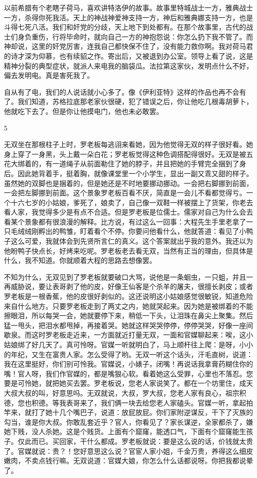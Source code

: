 以前希腊有个老瞎子荷马，喜欢讲特洛伊的故事。故事里特城战士一方，雅典战士一方，杀得你死我活。天上的神战神爱神支持一方，神后和雅典娜支持一方，也是斗得七死八活。我们和奸党的分歧，天上地下到处都有。在那个故事里，古代的战士们身负重伤，行将毕命时，就向自己一方的神抱怨说：你怎么扔下我不管了。而神却说，这里的奸党厉害，连我自己都快保不住了，没有能力救你啊。我对荷马君的诗才深为仰慕，也有续貂之作。寄出后，又被退到办公室。领导上看了说，这是精神分裂的典型症状，就派人来电我的脑袋瓜。法拉第这家伙，发明点什么不好，偏去发明电。真是害死我了。 

自从有了电，我们的人说话就小心多了。像《伊利亚特》这样的作品也再不会有了。我们知道，苏格拉底那老家伙很硬，犯了错误之后，你让他吃几根毒胡萝卜，他就吃下去了。但是你让他摸电门，他也未必敢罢。 

5 

无双坐在那根柱子上时，罗老板每逃诩来看她，因为他觉得无双的样子很好看。她身上穿了一身黑，头上戴一朵白花；罗老板觉得这种色调搭配得很好。无双是被五花大绑着的，有一道绳子从前面勒住了她的脖子，并且把她的手臂完全捆到了身后。因此她背着手，挺着胸，就像课堂里一个小学生，显出一副又乖又甜的样子。虽然她的双脚也是捆着的，但是她还是不时地要挪动挪动。一会把右脚挪到前面，一会把左脚挪到前面。这个景象罗老板百看不厌，简直是一会儿不看都觉得亏。一个十六七岁的小姑娘，爹死了，娘卖了，自己像一双鞋一样被摆上了货架，你老去看人家，我觉得多少是有点不合适。但是罗老板是位儒士。儒家对自己为什么会去看某个景象都有很浪漫的解释。比方说，有过这么一回事：大程先生手里老拿了一只毛绒绒刚孵出的鸭雏，盯着看个不停。你要问他看什么，他就答道：看见了小鸭子这么可爱，我就体会到先贤所言仁的真义。这个答案就出乎我的意外。我还以为他盼鸭子快点长，好烤来吃呢。罗老板老去看无双，当然有正当的理由，但具体是什么，我不知道。你就顺着大程的思路去想像罢。 

不知为什么，无双见到了罗老板就要破口大骂，说他是一条蛔虫，一只蛆，并且一再威胁说，要让表哥剥了他的皮，好像王仙客是个杀羊的屠夫，很擅长剥皮；或者罗老板是一根香蕉，他的皮很好剥似的。这还说明这小姑娘感觉很敏锐，知道危险来自什么地方。只要罗老板走到了两丈之内，她就哭起来。因为她是被绑着的不能擦眼泪，所以每哭一会，她就要停下来，稍低一下头，让泪珠在鼻尖上聚集。然后猛一甩头，把泪水都甩掉，再接着哭。她就这样哭哭停停，停停哭哭，好像一座间歇泉。而这时罗老板走近来，一方面就近打量无双，一面和官媒聊起来：唉，这小姑娘绑了好几天了。真可怜呀。官媒一听就明白了，马上顺杆往上爬：是呀，小小的年纪，又生在富贵人家。怎么受得了哟。无双一听这个话头，汗毛直树，说道：我在这里挺好，你们别可怜我。官媒说，小婊子，闭嘴！再说话我拿膏药糊住你的嘴！官人呀，我们作官媒的，都是嘴狠心软。看着她这么受罪，心里也不落忍。您要是可怜她，就把她买去罢。罗老板说，您老人家说笑了。都在一个坊里住，成天大叔大叔的叫，好意思吗。无双就说，大叔，罗大叔，您老人家有良心，祖宗积德，您也积德。等我表哥来了，我们俩一块去给您老人家磕头。官媒一听，拿起拍竿来，就打了她十几个嘴巴子，说道：放屁放屁。你们家附逆谋反，干下了灭族的勾当，谁是你大叔。你敢乱套近乎？官人，你看见了？家长谋逆，全家都杀了，嫌她下贱，没人杀她。这是个贱货。上面有个窟窿，能透口气，下面有个窟窿能生孩子。仅此而已。买回家，干什么都成。罗老板就说：要是这么说的话，价钱就太贵了。官媒就说：贵？！您好意思这么说？官宦人家小姐，千金万贵，养得这么细皮嫩肉，不卖点钱行嘛。无双说道：官媒大娘，你怎么什么话都说呀。你把我都说晕了。 

